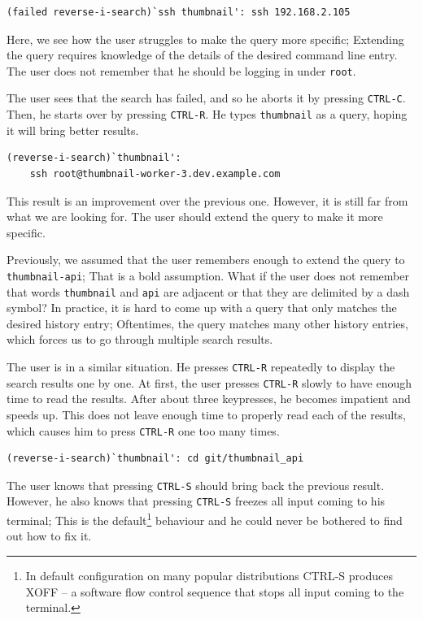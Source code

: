 \begin{verbatim}
(failed reverse-i-search)`ssh thumbnail': ssh 192.168.2.105
\end{verbatim}

Here, we see how the user struggles to make the query more specific; Extending the query requires knowledge of the details of the desired command line entry. The user does not remember that he should be logging in under \verb|root|. %

The user sees that the search has failed, and so he aborts it by pressing \verb|CTRL-C|. Then, he starts over by pressing \verb|CTRL-R|. He types \verb|thumbnail| as a query, hoping it will bring better results.


\begin{verbatim}
(reverse-i-search)`thumbnail':
    ssh root@thumbnail-worker-3.dev.example.com
\end{verbatim}

This result is an improvement over the previous one. However, it is still far from what we are looking for. The user should extend the query to make it more specific. 

Previously, we assumed that the user remembers enough to extend the query to \verb|thumbnail-api|; That is a bold assumption. What if the user does not remember that words \verb|thumbnail| and \verb|api| are adjacent or that they are delimited by a dash symbol? In practice, it is hard to come up with a query that only matches the desired history entry; Oftentimes, the query matches many other history entries, which forces us to go through multiple search results.


The user is in a similar situation. He presses \verb|CTRL-R| repeatedly to display the search results one by one. At first, the user presses \verb|CTRL-R| slowly to have enough time to read the results. After about three keypresses, he becomes impatient and speeds up. This does not leave enough time to properly read each of the results, which causes him to press \verb|CTRL-R| one too many times.

\begin{verbatim}
(reverse-i-search)`thumbnail': cd git/thumbnail_api
\end{verbatim}

The user knows that pressing \verb|CTRL-S| should bring back the previous result. However, he also knows that pressing \verb|CTRL-S| freezes all input coming to his terminal; This is the default\footnote{In default configuration on many popular distributions CTRL-S produces XOFF -- a software flow control sequence that stops all input coming to the terminal.} behaviour and he could never be bothered to find out how to fix it.

